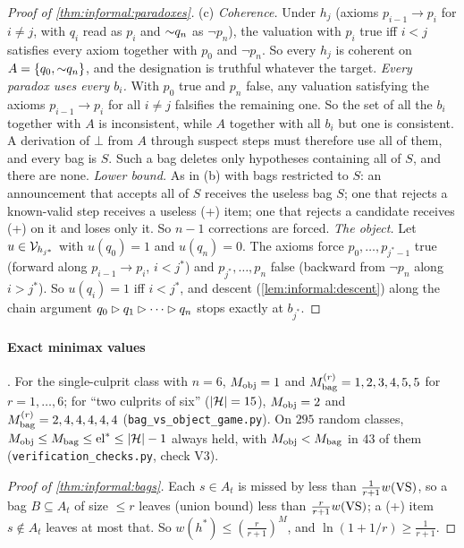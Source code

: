 \begin{proof}[Proof of \cref{thm:informal:paradoxes}]
(c) \emph{Coherence.} Under $h_j$ (axioms $p_{i-1}\to p_i$ for $i\ne j$, with $q_i$ read as $p_i$ and ${\sim} q_n$ as $\neg p_n$), the valuation with $p_i$ true iff $i<j$ satisfies every axiom together with $p_0$ and $\neg p_n$. So every $h_j$ is coherent on $A=\{q_0,{\sim} q_n\}$, and the designation is truthful whatever the target.
\emph{Every paradox uses every $b_i$.} With $p_0$ true and $p_n$ false, any valuation satisfying the axioms $p_{i-1}\to p_i$ for all $i\ne j$ falsifies the remaining one. So the set of all the $b_i$ together with $A$ is inconsistent, while $A$ together with all $b_i$ but one is consistent. A derivation of $\bot$ from $A$ through suspect steps must therefore use all of them, and every bag is $S$. Such a bag deletes only hypotheses containing all of $S$, and there are none.
\emph{Lower bound.} As in (b) with bags restricted to $S$: an announcement that accepts all of $S$ receives the useless bag $S$; one that rejects a known-valid step receives a useless (+) item; one that rejects a candidate receives (+) on it and loses only it. So $n-1$ corrections are forced.
\emph{The object.} Let $u\in\mathcal V_{h_{j^*}}$ with $u(q_0)=1$ and $u(q_n)=0$. The axioms force $p_0,\dots,p_{j^*-1}$ true (forward along $p_{i-1}\to p_i$, $i<j^*$) and $p_{j^*},\dots,p_n$ false (backward from $\neg p_n$ along $i>j^*$). So $u(q_i)=1$ iff $i<j^*$, and descent (\cref{lem:informal:descent}) along the chain argument $q_0\rhd q_1\rhd\cdots\rhd q_n$ stops exactly at $b_{j^*}$.
\end{proof}

\paragraph{Exact minimax values} . For the single-culprit class with $n=6$, $M_{\mathrm{obj}}=1$ and $M^{(r)}_{\mathrm{bag}}=1,2,3,4,5,5$ for $r=1,\dots,6$; for ``two culprits of six'' ($|\mathcal{H}|=15$), $M_{\mathrm{obj}}=2$ and $M^{(r)}_{\mathrm{bag}}=2,4,4,4,4,4$ (\texttt{bag\_vs\_object\_game.py}). On $295$ random classes, $M_{\mathrm{obj}}\le M_{\mathrm{bag}}\le\mathrm{el}^*\le|\mathcal{H}|-1$ always held, with $M_{\mathrm{obj}}<M_{\mathrm{bag}}$ in $43$ of them (\texttt{verification\_checks.py}, check V3).

\begin{proof}[Proof of \cref{thm:informal:bags}]
Each $s\in A_t$ is missed by less than $\frac1{r+1}w(\mathrm{VS})$, so a bag $B\subseteq A_t$ of size $\le r$ leaves (union bound) less than $\frac r{r+1}w(\mathrm{VS})$; a (+) item $s\notin A_t$ leaves at most that. So $w(h^*)\le(\frac r{r+1})^M$, and $\ln(1+1/r)\ge\frac1{r+1}$.
\end{proof}

